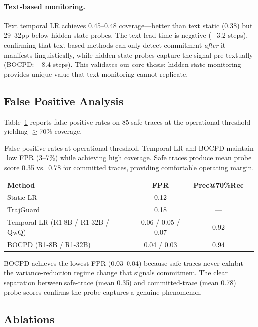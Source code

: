 \documentclass[11pt,a4paper]{article}
\begin{document}
\paragraph{Text-based monitoring.} Text temporal LR achieves 0.45--0.48 coverage---better than text static (0.38) but 29--32pp below hidden-state probes. The text lead time is negative ($-$3.2 steps), confirming that text-based methods can only detect commitment \emph{after} it manifests linguistically, while hidden-state probes capture the signal pre-textually (BOCPD: +8.4 steps). This validates our core thesis: hidden-state monitoring provides unique value that text monitoring cannot replicate.

\subsection{False Positive Analysis}
\label{sec:exp-fpr}

Table~\ref{tab:fpr} reports false positive rates on 85 safe traces at the operational threshold yielding $\geq$70\% coverage.

\begin{table}[t]
\centering
\small
\begin{tabular}{lccc}
\toprule
\textbf{Method} & \textbf{FPR} & \textbf{Prec@70\%Rec} \\
\midrule
Static LR & 0.12 & --- \\
TrajGuard & 0.18 & --- \\
Temporal LR (R1-8B / R1-32B / QwQ) & 0.06 / 0.05 / 0.07 & 0.92 \\
BOCPD (R1-8B / R1-32B) & 0.04 / 0.03 & 0.94 \\
\bottomrule
\end{tabular}
\caption{False positive rates at operational threshold. Temporal LR and BOCPD maintain low FPR (3--7\%) while achieving high coverage. Safe traces produce mean probe score 0.35 vs.\ 0.78 for committed traces, providing comfortable operating margin.}
\label{tab:fpr}
\end{table}

BOCPD achieves the lowest FPR (0.03--0.04) because safe traces never exhibit the variance-reduction regime change that signals commitment. The clear separation between safe-trace (mean 0.35) and committed-trace (mean 0.78) probe scores confirms the probe captures a genuine phenomenon.

\subsection{Ablations}
\label{sec:ablations}
\end{document}
